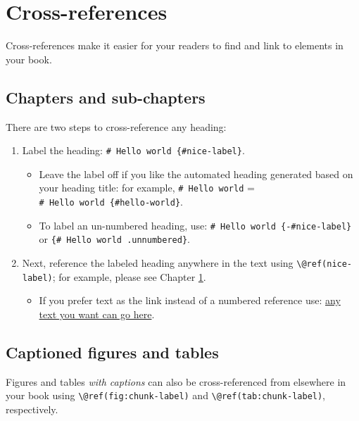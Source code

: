 \documentclass[
]{book}
\providecommand{\tightlist}{%
  \setlength{\itemsep}{0pt}\setlength{\parskip}{0pt}}
\theoremstyle{definition}
\theoremstyle{definition}
\theoremstyle{definition}
\theoremstyle{definition}
\theoremstyle{remark}
\begin{document}
\hypertarget{cross}{%
\chapter{Cross-references}\label{cross}}

Cross-references make it easier for your readers to find and link to elements in your book.

\hypertarget{chapters-and-sub-chapters}{%
\section{Chapters and sub-chapters}\label{chapters-and-sub-chapters}}

There are two steps to cross-reference any heading:

\begin{enumerate}
\def\labelenumi{\arabic{enumi}.}
\tightlist
\item
  Label the heading: \texttt{\#\ Hello\ world\ \{\#nice-label\}}.

  \begin{itemize}
  \tightlist
  \item
    Leave the label off if you like the automated heading generated based on your heading title: for example, \texttt{\#\ Hello\ world} = \texttt{\#\ Hello\ world\ \{\#hello-world\}}.
  \item
    To label an un-numbered heading, use: \texttt{\#\ Hello\ world\ \{-\#nice-label\}} or \texttt{\{\#\ Hello\ world\ .unnumbered\}}.
  \end{itemize}
\item
  Next, reference the labeled heading anywhere in the text using \texttt{\textbackslash{}@ref(nice-label)}; for example, please see Chapter \ref{cross}.

  \begin{itemize}
  \tightlist
  \item
    If you prefer text as the link instead of a numbered reference use: \protect\hyperlink{cross}{any text you want can go here}.
  \end{itemize}
\end{enumerate}

\hypertarget{captioned-figures-and-tables}{%
\section{Captioned figures and tables}\label{captioned-figures-and-tables}}

Figures and tables \emph{with captions} can also be cross-referenced from elsewhere in your book using \texttt{\textbackslash{}@ref(fig:chunk-label)} and \texttt{\textbackslash{}@ref(tab:chunk-label)}, respectively.
\end{document}

